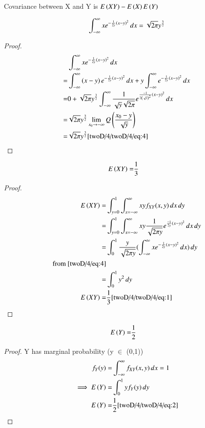 Covariance between X and Y is $E\left(XY\right)-E\left(X\right)E\left(Y\right)$\\
\begin{lemma}
\begin{align}
    \int_{-\infty}^{\infty}xe^{-\frac{1}{2y}\left(x-y\right)^2}\,dx = \sqrt{2\pi}y^\frac{3}{2}
\end{align}
\end{lemma}
\begin{proof}
\begin{align}
    &\int_{-\infty}^{\infty}xe^{-\frac{1}{2y}\left(x-y\right)^2}\,dx\\
  =&\int_{-\infty}^{\infty}\left(x-y\right)e^{-\frac{1}{2y}\left(x-y\right)^2}\,dx+y\int_{-\infty}^{\infty}e^{-\frac{1}{2y}\left(x-y\right)^2}\,dx\\
 =&0+\sqrt{2\pi}y^{\frac{3}{2}}\int_{-\infty}^{\infty}\frac{1}{\sqrt{y}\sqrt{2\pi}}e^{\frac{-1}{2\left(\sqrt{y}\right)^2}\left(x-y\right)^2}\,dx\\
 =&\sqrt{2\pi}y^\frac{3}{2}\lim_{x_0 \to -\infty}Q\left(\frac{x_0 - y}{\sqrt{y}}\right)\\
  =&\sqrt{2\pi}y^\frac{3}{2} \ref{twoD/4/twoD/4/eq:4}
\end{align}
\end{proof}
\begin{lemma}
\begin{align}
   E\left(XY\right)=&\frac{1}{3}   
\end{align}
\end{lemma}
\begin{proof}
\begin{align}
    E\left(XY\right)=&\int_{y=0}^{1}\int_{x=-\infty}^{\infty}xy f_{XY}(x,y)\,dx\,dy\\
    =&\int_{y=0}^{1}\int_{x=-\infty}^{\infty}xy\frac{1}{\sqrt{2\pi y}}e^{\frac{-1}{2y}(x-y)^2}\,dx \,dy\\
    =&\int_{0}^{1}\frac{y}{\sqrt{2\pi y}}(\int_{-\infty}^{\infty}xe^{-\frac{1}{2y}(x-y)^2}\,dx)\,dy\\
    \text{from \eqref{twoD/4/eq:4}}\\
    =&\int_{0}^{1}y^2 \,dy\\
     E\left(XY\right)=&\frac{1}{3} \ref{twoD/4/twoD/4/eq:1}
    \end{align}
\end{proof} 
\begin{lemma}
\begin{align}
     E\left(Y\right)=&\frac{1}{2}
\end{align}
\end{lemma}
\begin{proof}
Y has marginal probability (y $\in$ (0,1))
\begin{align}
    f_Y(y)=&\int_{-\infty}^{\infty}f_{XY}(x,y)\,dx =1\\
    \implies E\left(Y\right)=&\int_{0}^{1} y f_{Y}(y)\,dy\\
    E\left(Y\right)=&\frac{1}{2} \ref{twoD/4/twoD/4/eq:2}
\end{align}
\end{proof}
